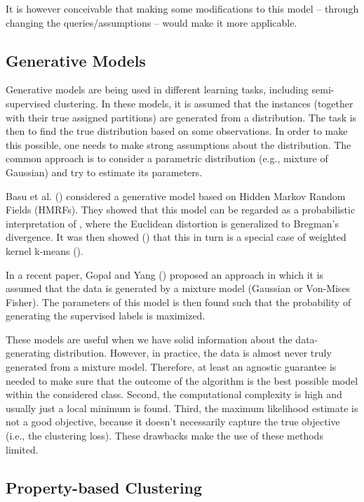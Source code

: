 \documentclass[letterpaper,12pt,titlepage,oneside,final]{book}
\begin{document}
It is however conceivable that making some modifications to this model -- through changing the queries/assumptions -- would make it more applicable.


\subsection{Generative Models}

Generative models are being used in different learning tasks, including semi-supervised clustering. In these models, it is assumed that the instances (together with their true assigned partitions) are generated from a distribution. The task is then to find the true distribution based on some observations. In order to make this possible, one needs to make strong assumptions about the distribution. The common approach is to consider a parametric distribution (e.g., mixture of Gaussian) and try to estimate its parameters.

Basu et al. (\cite{basu2004probabilistic}) considered a generative model based on Hidden Markov Random Fields (HMRFs). They showed that this model can be regarded as a probabilistic interpretation of \cite{basu2003comparing}, where the Euclidean distortion is generalized to Bregman's divergence. It was then showed (\cite{kulis2009semi}) that this in turn is a special case of weighted kernel k-means (\cite{dhillon2004kernel}).

In a recent paper, Gopal and Yang (\cite{gopaltransformation}) proposed an approach in which it is assumed that the data is generated by a mixture model (Gaussian or Von-Mises Fisher). The parameters of this model is then found such that the probability of generating the supervised labels is maximized.

These models are useful when we have solid information about the data-generating distribution. However, in practice, the data is almost never truly generated from a mixture model. Therefore, at least an agnostic guarantee is needed to make sure that the outcome of the algorithm is the best possible model within the considered class. Second, the computational complexity is high and usually just a local minimum is found. Third, the maximum likelihood estimate is not a good objective, because it doesn't necessarily capture the true objective (i.e., the clustering loss). These drawbacks make the use of these methods limited.

\subsection{Property-based Clustering}
\end{document}
